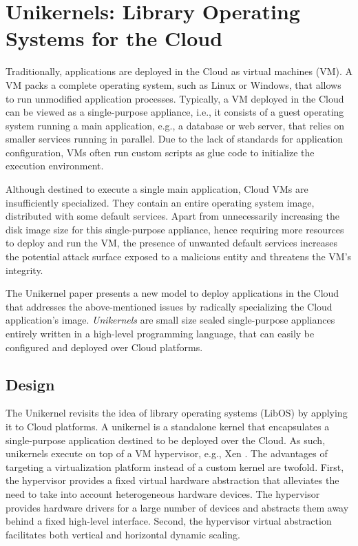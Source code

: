 \section{Unikernels: Library Operating Systems for the Cloud}
Traditionally, applications are deployed in the Cloud as virtual machines (VM).
A VM packs a complete operating system, such as Linux or Windows, that allows to run unmodified application processes.
Typically, a VM deployed in the Cloud can be viewed as a single-purpose appliance, i.e., it consists of a guest operating system running a main application, e.g., a database or web server, that relies on smaller services running in parallel.
Due to the lack of standards for application configuration, VMs often run custom scripts as glue code to initialize the execution environment.

Although destined to execute a single main application, Cloud VMs are insufficiently specialized.
They contain an entire operating system image, distributed with some default services.
Apart from unnecessarily increasing the disk image size for this single-purpose appliance, hence requiring more resources to deploy and run the VM, the presence of unwanted default services increases the potential attack surface exposed to a malicious entity and threatens the VM's integrity.

The Unikernel paper \cite{DBLP:conf/asplos/MadhavapeddyMRSSGSHC13} presents a new model to deploy applications in the Cloud that addresses the above-mentioned issues by radically specializing the Cloud application's image.
\emph{Unikernels} are small size sealed single-purpose appliances entirely written in a high-level programming language, that can easily be configured and deployed over Cloud platforms.

\subsection{Design}
The Unikernel revisits the idea of library operating systems (LibOS) by applying it to Cloud platforms.
A unikernel is a standalone kernel that encapsulates a single-purpose application destined to be deployed over the Cloud.
As such, unikernels execute on top of a VM hypervisor, e.g., Xen \cite{DBLP:conf/sosp/BarhamDFHHHN03}.
The advantages of targeting a virtualization platform instead of a custom kernel are twofold.
First, the hypervisor provides a fixed virtual hardware abstraction that alleviates the need to take into account heterogeneous hardware devices.
The hypervisor provides hardware drivers for a large number of devices and abstracts them away behind a fixed high-level interface.
Second, the hypervisor virtual abstraction facilitates both vertical and horizontal dynamic scaling.

